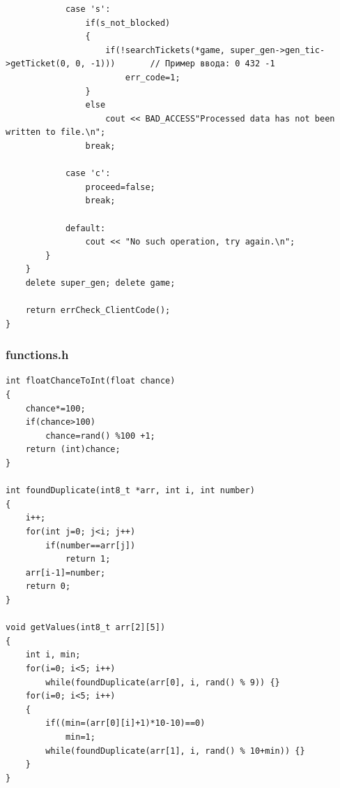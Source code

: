 \documentclass[a4paper,14pt]{article}
\begin{document}
\begin{verbatim}
            case 's':
                if(s_not_blocked)
                {
                    if(!searchTickets(*game, super_gen->gen_tic->getTicket(0, 0, -1)))       // Пример ввода: 0 432 -1
                        err_code=1;
                }
                else
                    cout << BAD_ACCESS"Processed data has not been written to file.\n";
                break;

            case 'c':
                proceed=false;
                break;

            default:
                cout << "No such operation, try again.\n";
        }
    }
    delete super_gen; delete game;

    return errCheck_ClientCode();
}
\end{verbatim}
\subsubsection{functions.h}
\begin{verbatim}
int floatChanceToInt(float chance)
{
    chance*=100;
    if(chance>100)
        chance=rand() %100 +1;
    return (int)chance;
}

int foundDuplicate(int8_t *arr, int i, int number)
{
    i++;
    for(int j=0; j<i; j++)
        if(number==arr[j])
            return 1;
    arr[i-1]=number;
    return 0;
}

void getValues(int8_t arr[2][5])
{
    int i, min;
    for(i=0; i<5; i++)
        while(foundDuplicate(arr[0], i, rand() % 9)) {}
    for(i=0; i<5; i++)
    {
        if((min=(arr[0][i]+1)*10-10)==0)
            min=1;
        while(foundDuplicate(arr[1], i, rand() % 10+min)) {}
    }
}

\end{verbatim}
\end{document}
